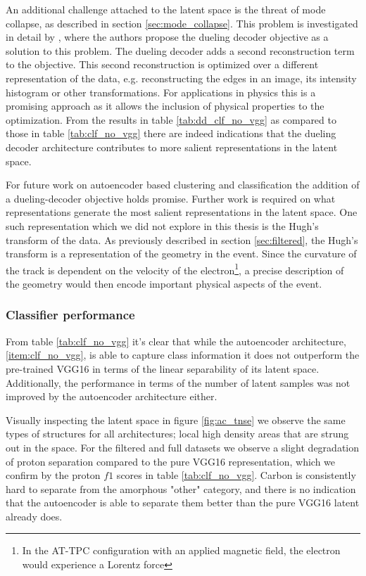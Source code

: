 An additional challenge attached to the latent space is the threat of mode collapse, as described in section \ref{sec:mode_collapse}. This problem is investigated in detail by \citet{Seybold2019}, where the authors propose the dueling decoder objective as a solution to this problem. The dueling decoder adds a second reconstruction term to the objective. This second reconstruction is optimized over a different representation of the data, e.g. reconstructing the edges in an image, its intensity histogram or other transformations. For applications in physics this is a promising approach as it allows the inclusion of physical properties to the optimization. From the results in table \ref{tab:dd_clf_no_vgg} as compared to those in table \ref{tab:clf_no_vgg} there are indeed indications that the dueling decoder architecture contributes to more salient representations in the latent space. 

For future work on autoencoder based clustering and classification the addition of a dueling-decoder objective holds promise. Further work is required on what representations generate the most salient representations in the latent space. One such representation which we did not explore in this thesis is the Hugh's transform of the data. As previously described in section \ref{sec:filtered}, the Hugh's transform is a representation of the geometry in the event. Since the curvature of the track is dependent on the velocity of the electron\footnote{In the AT-TPC configuration with an applied magnetic field, the electron would experience a Lorentz force}, a precise description of the geometry would then encode important physical aspects of the event.


\subsubsection{Classifier performance}

From table \ref{tab:clf_no_vgg} it's clear that while the autoencoder architecture, \ref{item:clf_no_vgg}, is able to capture class information it does not outperform the pre-trained VGG16 in terms of the linear separability of its latent space. Additionally, the performance in terms of the number of latent samples was not improved by the autoencoder architecture either. 

Visually inspecting the latent space in figure \ref{fig:ac_tnse} we observe the same types of structures for all architectures; local high density areas that are strung out in the space. For the filtered and full datasets we observe a slight degradation of proton separation compared to the pure VGG16 representation, which we confirm by the proton $f1$ scores in table \ref{tab:clf_no_vgg}. Carbon is consistently hard to separate from the amorphous "other" category, and there is no indication that the autoencoder is able to separate them better than the pure VGG16 latent already does. 

